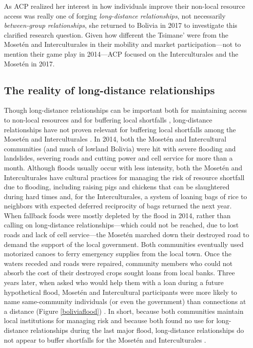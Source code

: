 \documentclass[bibauthoryear]{aa}
\begin{document}
As ACP realized her interest in how individuals improve their non-local resource access was really one of forging \textit{long-distance relationships}, not necessarily \textit{between-group relationships}, she returned to Bolivia in 2017 to investigate this clarified research question. Given how different the Tsimane’ were from the Mosetén and Interculturales in their mobility and market participation---not to mention their game play in 2014---ACP focused on the Interculturales and the Moset\'en in 2017.
	
	\subsection{The reality of long-distance relationships}\label{distance}
	Though long-distance relationships can be important both for maintaining access to non-local resources and for buffering local shortfalls \citep{pisor2019evolution}, long-distance relationships have not proven relevant for buffering local shortfalls among the Moset\'en and Interculturales \citep{pisorjones2020}. In 2014, both the Moset\'en and Intercultural communities (and much of lowland Bolivia) were hit with severe flooding and landslides, severing roads and cutting power and cell service for more than a month. Although floods usually occur with less intensity, both the Moset\'en and Interculturales have cultural practices for managing the risk of resource shortfall due to flooding, including raising pigs and chickens that can be slaughtered during hard times and, for the Interculturales, a system of loaning bags of rice to neighbors with expected deferred reciprocity of bags returned the next year. When fallback foods were mostly depleted by the flood in 2014, rather than calling on long-distance relationships---which could not be reached, due to lost roads and lack of cell service---the Moset\'en marched down their destroyed road to demand the support of the local government. Both communities eventually used motorized canoes to ferry emergency supplies from the local town. Once the waters receded and roads were repaired, community members who could not absorb the cost of their destroyed crops sought loans from local banks. Three years later, when asked who would help them with a loan during a future hypothetical flood, Moset\'en and Intercultural participants were more likely to name same-community individuals (or even the government) than connections at a distance (Figure \ref{boliviaflood}) \citep{pisorjones2020}. In short, because both communities maintain local institutions for managing risk and because both found no use for long-distance relationships during the last major flood, long-distance relationships do not appear to buffer shortfalls for the Moset\'en and Interculturales \citep{pisorjones2020}.
\end{document}
